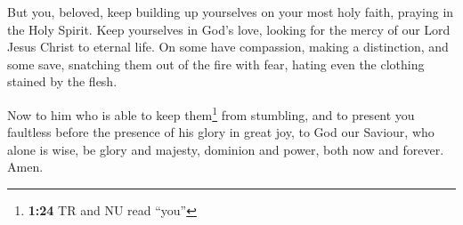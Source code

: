  But you, beloved, keep building up yourselves on your
most holy faith, praying in the Holy Spirit.  Keep
yourselves in God's love, looking for the mercy of our Lord Jesus Christ
to eternal life.  On some have compassion, making a
distinction,  and some save, snatching them out of the
fire with fear, hating even the clothing stained by the flesh.

 Now to him who is able to keep them\footnote{\textbf{1:24}
  TR and NU read ``you''} from stumbling, and to present you faultless
before the presence of his glory in great joy,  to God
our Saviour, who alone is wise, be glory and majesty, dominion and
power, both now and forever. Amen.
